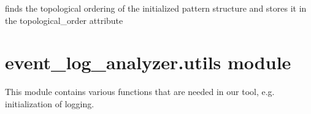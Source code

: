 \documentclass[letterpaper,10pt,english]{sphinxmanual}
\begin{document}
\begin{fulllineitems}

\begin{fulllineitems}
\label{\detokenize{event_log_analyzer:event_log_analyzer.pattern_library.pattern_structure.PatternStructure.topological_ordering}}
\sphinxAtStartPar
finds the topological ordering of the initialized pattern structure and stores it in the topological\_order attribute

\end{fulllineitems}


\end{fulllineitems}



\section{event\_log\_analyzer.utils module}
\label{\detokenize{event_log_analyzer:module-event_log_analyzer.utils}}\label{\detokenize{event_log_analyzer:event-log-analyzer-utils-module}}
\sphinxAtStartPar
This module contains various functions that are needed in our tool, e.g. initialization of logging.
\end{document}
